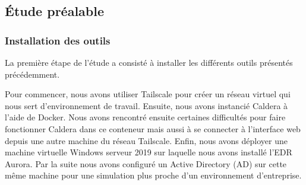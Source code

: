 \documentclass[12pt,letterpaper]{article}
\begin{document}
\subsection{Étude préalable}
\subsubsection{Installation des outils}

La première étape de l'étude a consisté à installer les différents outils présentés précédemment.

\bigskip

Pour commencer, nous avons utiliser Tailscale pour créer un réseau virtuel qui nous sert d'environnement de travail.
Ensuite, nous avons instancié Caldera à l'aide de Docker.
Nous avons rencontré ensuite certaines difficultés pour faire fonctionner Caldera dans ce conteneur mais aussi à se connecter à l'interface web depuis une autre machine du réseau Tailscale.
Enfin, nous avons déployer une machine virtuelle Windows serveur 2019 sur laquelle nous avons installé l'EDR Aurora.
Par la suite nous avons configuré un Active Directory (AD) sur cette même machine pour une simulation plus proche d'un environnement d'entreprise.
\end{document}
